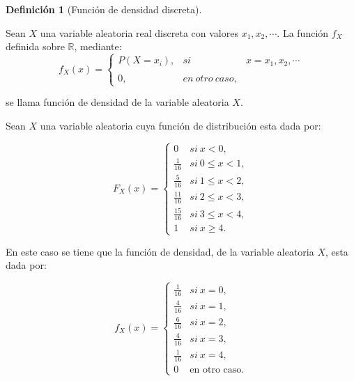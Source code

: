 \documentclass[
  us-letterpaper,
]{scrreprt}
\theoremstyle{plain}
\theoremstyle{plain}
\theoremstyle{definition}
\newtheorem{definition}{Definición}[chapter]
\theoremstyle{remark}
\begin{document}
\begin{definition}[Función de densidad
discreta]\protect\hypertarget{def-fun_den_dis}{}\label{def-fun_den_dis}

Sean \(X\) una variable aleatoria real discreta con valores
\(x_1, x_2, \dotsb\). La función \(f_X\) definida sobre \(\mathbb{R}\),
mediante:
\[f_X(x) = \left\{ \begin{array}{lcc} P(X = x_i), & si & x = x_1, x_2,  \dotsb \\ \\ 0, & en \ otro \ caso, \end{array} \right. \]

se llama función de densidad de la variable aleatoria \(X\).

\end{definition}

\begin{tcolorbox}[enhanced jigsaw, titlerule=0mm, opacityback=0, coltitle=black, bottomrule=.15mm, colbacktitle=quarto-callout-caution-color!10!white, toprule=.15mm, colback=white, arc=.35mm, colframe=quarto-callout-caution-color-frame, leftrule=.75mm, bottomtitle=1mm, left=2mm, toptitle=1mm, opacitybacktitle=0.6, breakable, title={Ejemplo (\textbf{\emph{Función de densidad discreta}})}, rightrule=.15mm]

Sean \(X\) una variable aleatoria cuya función de distribución esta dada
por:

\[
F_X(x)= \left\{ \begin{array}{lcc} 0 & si \ x< 0, \\  \frac{1}{16} & si \ 0\leq x<1, \\ \frac{5}{16} & si \ 1\leq x <2,\\ \frac{11}{16} & si \ 2\leq x<3, \\ \frac{15}{16} & si \ 3\leq x <4, \\ 1 & si \ x\geq 4. \end{array} \right.
\]

En este caso se tiene que la función de densidad, de la variable
aleatoria \(X\), esta dada por:

\[
f_X(x)= \left\{ \begin{array}{lcc} \frac{1}{16} & si \ x = 0,\\ \frac{4}{16} & si \ x = 1, \\ \frac{6}{16} & si \  x = 2, \\ \frac{4}{16} & si \ x=3, \\ \frac{1}{16} & si \ x = 4, \\ 0 & \text{en otro caso.}\end{array} \right.
\]

\end{tcolorbox}
\end{document}
